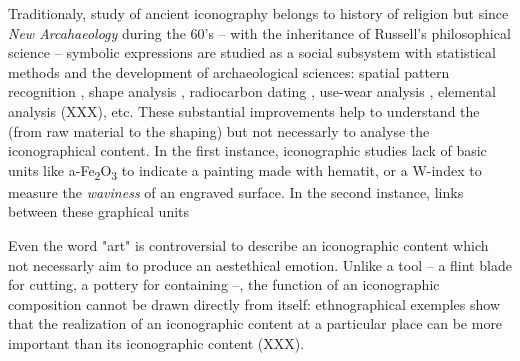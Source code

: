 \documentclass[article]{jss}
\begin{document}

Traditionaly, study of ancient iconography belongs to history of religion but since \textit{New Arcahaeology} during the 60's -- with the inheritance of Russell's philosophical science -- symbolic expressions are studied as a social subsystem \citep{Renfrew91} with statistical methods and the development of archaeological sciences: spatial pattern recognition \citep{LeroiGourhan92}, shape analysis \citep{Ibanez20}, radiocarbon dating \citep{Pettitt03}, use-wear analysis \citep{Calandra19}, elemental analysis (XXX), etc. These substantial improvements help to understand the  (from raw material to the shaping) but not necessarly to analyse the iconographical content. 
In the first instance, iconographic studies lack of basic units like a-Fe\textsubscript{2}O\textsubscript{3} to indicate a painting made with hematit, or a W-index to measure the \textit{waviness} of an engraved surface. In the second instance, links between these graphical units

Even the word "art" is controversial to describe an iconographic content which not necessarly aim to produce an aestethical emotion. Unlike a tool -- a flint blade for cutting, a pottery for containing --, the function of an iconographic composition cannot be drawn directly from itself: ethnographical exemples show that the realization of an iconographic content at a particular place can be more important than its iconographic content (XXX). 
\end{document}
